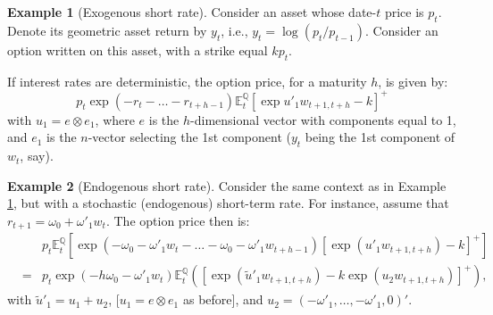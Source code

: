 \documentclass[
  12pt,
]{book}
\theoremstyle{definition}
\theoremstyle{definition}
\newtheorem{example}{Example}[chapter]
\theoremstyle{definition}
\theoremstyle{definition}
\theoremstyle{remark}
\begin{document}
\begin{example}[Exogenous short rate]
\protect\hypertarget{exm:ExogSTR}{}\label{exm:ExogSTR}Consider an asset whose date-\(t\) price is \(p_t\). Denote its geometric asset return by \(y_t\), i.e., \(y_t = \log(p_t/p_{t-1})\). Consider an option written on this asset, with a strike equal \(k p_t\).

If interest rates are deterministic, the option price, for a maturity \(h\), is given by:
\[
p_t   \exp(-r_{t}-\dots-r_{t+h-1}) \mathbb{E}^{\mathbb{Q}}_t[\exp   u'_1 w_{t+1, t+h} - k]^+
\]
with \(u_1 = e \otimes e_1\), where \(e\) is the \(h\)-dimensional vector with components equal to 1, and \(e_1\) is the \(n\)-vector selecting the 1st component (\(y_t\) being the 1st component of \(w_t\), say).
\end{example}

\begin{example}[Endogenous short rate]
\protect\hypertarget{exm:EndogSTR}{}\label{exm:EndogSTR}Consider the same context as in Example \ref{exm:ExogSTR}, but with a stochastic (endogenous) short-term rate. For instance, assume that \(r_{t+1} = \omega_0 + \omega'_1 w_t\). The option price then is:
\begin{eqnarray*}
&& p_t \mathbb{E}^{\mathbb{Q}}_t  \left[ \exp(-\omega_0 - \omega'_1 w_t-\dots- \omega_0 - \omega'_1 w_{t+h-1}) [\exp(u'_1 w_{t+1,t+h})-k]^+ \right]\\
&= & p_t   \exp(-h \omega_0 - \omega'_1 w_t)\mathbb{E}^{\mathbb{Q}}_t\left(\left[\exp(\tilde{u}'_1w_{t+1,t+h})-k   \exp(u_2 w_{t+1, t+h})\right]^+\right),
\end{eqnarray*}
with \(\tilde{u}'_1 = u_1 + u_2\), {[}\(u_1 = e \otimes e_1\) as before{]}, and \(u_2 = (-\omega'_1,\dots, -\omega'_1, 0)'\).
\end{example}
\end{document}
